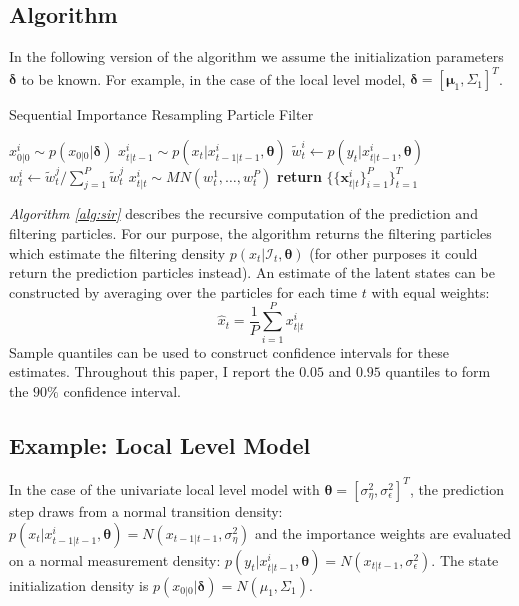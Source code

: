 \documentclass[11pt, oneside]{scrreprt}   	%
\begin{document}
\subsection{Algorithm}
In the following version of the algorithm we assume the initialization parameters $\boldsymbol{\delta}$ to be known. For example, in the case of the local level model, $\boldsymbol{\delta} = [\boldsymbol{\mu}_1, \Sigma_1]^T$.\\

\begin{algorithm}[h!]
\caption{Sequential Importance Resampling Particle Filter}
\label{alg:sir}
\begin{algorithmic}[1]
      	\smallskip
		\State $x_{0 | 0 }^i \sim p(x_{0 | 0 } | \boldsymbol{\delta})$ 
	\EndFor
      	\smallskip
      			\State $x_{t | t-1}^i \sim p(x_t | x_{t-1 | t-1}^i, \boldsymbol{\theta})$ 
			\smallskip
      			\State $\tilde{w}_t^i \gets p(y_t | x_{t | t-1}^i, \boldsymbol{\theta})$ 
		\EndFor	
		\smallskip
			\State $w_t^i \gets \tilde{w}_t^j / \sum_{j=1}^P \tilde{w}_t^j$ 
		\EndFor	
		\smallskip
			\State $x_{t | t }^i \sim MN(w_t^1, \ldots, w_t^P)$ 
		\EndFor
      \EndFor
      \State \textbf{return} $\{\{\boldsymbol{x}_{t | t}^i\}_{i=1}^P\}_{t=1}^T$
    \EndProcedure
  \end{algorithmic}
\end{algorithm}
\textit{Algorithm \ref{alg:sir}} describes the recursive computation of the prediction and filtering particles.  
For our purpose, the algorithm returns the filtering particles which estimate the filtering density $p(x_t | \mathcal{I}_t, \boldsymbol{\theta})$ (for other purposes it could return the prediction particles instead). 
An estimate of the latent states can be constructed by averaging over the particles for each time $t$ with equal weights: 
$$
\hat{x}_t = \frac{1}{P}\sum_{i=1}^P x_{t | t}^i
$$
Sample quantiles can be used to construct confidence intervals for these estimates. Throughout this paper, I report the $0.05$ and $0.95$ quantiles to form the $90\%$ confidence interval. 

\newpage
\subsection{Example: Local Level Model}
In the case of the univariate local level model with $\boldsymbol{\theta}=[\sigma_{\eta}^2, \sigma_{\epsilon}^2]^T$, the prediction step draws from a normal transition density: $p(x_t | x_{t-1 | t-1}^i, \boldsymbol{\theta}) = N(x_{t-1 | t-1}, \sigma_{\eta}^2)$ and the importance weights are evaluated on a normal measurement density: $p(y_t | x_{t | t-1}^i, \boldsymbol{\theta}) = N(x_{t | t-1}, \sigma_{\epsilon}^2)$. The state initialization density is $p(x_{0 | 0 } | \boldsymbol{\delta}) = N(\mu_1, \Sigma_1)$.\\
\end{document}
